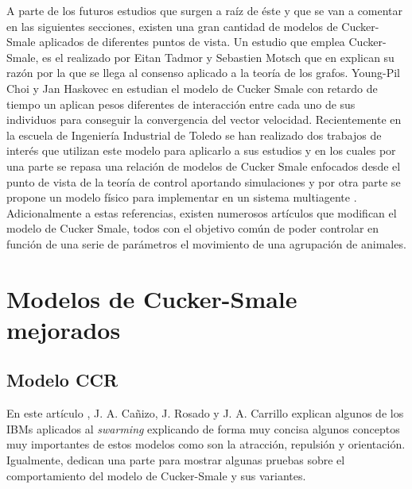 A parte de los futuros estudios que surgen a raíz de éste y que se van a comentar en las siguientes secciones, existen una gran cantidad de modelos de Cucker-Smale aplicados de diferentes puntos de vista. Un estudio que emplea Cucker-Smale, es el realizado por Eitan Tadmor y Sebastien Motsch que en \cite{motsch2014heterophilious} explican su razón por la que se llega al consenso aplicado a la teoría de los grafos. Young-Pil Choi y Jan Haskovec en \cite{choi2016cucker} estudian el modelo de Cucker Smale con retardo de tiempo un aplican pesos diferentes de interacción entre cada uno de sus individuos para conseguir la convergencia del vector velocidad. Recientemente en la escuela de Ingeniería Industrial de Toledo se han realizado dos trabajos de interés que utilizan este modelo para aplicarlo a sus estudios y en los cuales por una parte se repasa una relación de modelos de Cucker Smale enfocados desde el punto de vista de la teoría de control aportando simulaciones \cite{jb2019tfg} y por otra parte se propone un modelo físico para implementar en un sistema multiagente \cite{rc2019tfg}. Adicionalmente a estas referencias, existen numerosos artículos \cite{carrillo2010particle, albi2013binary, ha2008particle} que modifican el modelo de Cucker Smale, todos con el objetivo común de poder controlar en función de una serie de parámetros el movimiento de una agrupación de animales. 




\section{Modelos de Cucker-Smale mejorados}\label{s3_3}

\subsection{Modelo CCR} \label{s3_3_1}
En este artículo \cite{canizo2010collective},  J. A. Cañizo, J. Rosado y J. A. Carrillo explican algunos de los IBMs aplicados al \textit{swarming} explicando de forma muy concisa algunos conceptos muy importantes de estos modelos como son la atracción, repulsión y orientación. Igualmente, dedican una parte para mostrar algunas pruebas sobre el comportamiento del modelo de Cucker-Smale y sus variantes. 

